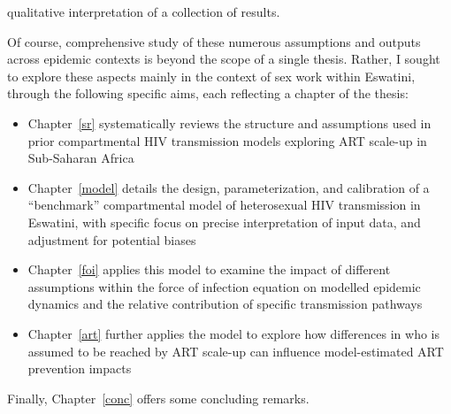 qualitative interpretation of a collection of results.
\par
Of course, comprehensive study of these numerous assumptions and outputs
across epidemic contexts is beyond the scope of a single thesis.
Rather, I sought to explore these aspects mainly in the context of sex work within Eswatini,
through the following specific aims, each reflecting a chapter of the thesis:
\begin{itemize}
  \item Chapter~\ref{sr} systematically reviews the structure and assumptions used in
  prior compartmental HIV transmission models exploring ART scale-up in Sub-Saharan Africa
  \item Chapter~\ref{model} details the design, parameterization, and calibration of
  a ``benchmark'' compartmental model of heterosexual HIV transmission in Eswatini,
  with specific focus on precise interpretation of input data, and adjustment for potential biases
  \item Chapter~\ref{foi} applies this model to examine
  the impact of different assumptions within the force of infection equation on
  modelled epidemic dynamics and the relative contribution of specific transmission pathways
  \item Chapter~\ref{art} further applies the model to explore
  how differences in who is assumed to be reached by ART scale-up
  can influence model-estimated ART prevention impacts
\end{itemize}
Finally, Chapter~\ref{conc} offers some concluding remarks.
